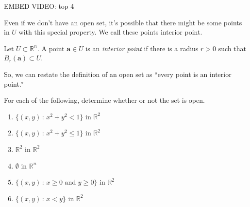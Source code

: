 \documentclass{ximera}
\begin{document}
\begin{minipage}{.5\textwidth}
\end{minipage}
\begin{minipage}{.5\textwidth}
EMBED VIDEO: top 4
\end{minipage}

Even if we don't have an open set, it's possible that there might be some points in $U$ with this special property. We call these points interior point.

\begin{definition}
Let $U\subset \mathbb{R}^n$. A point $\mathbf{a}\in U$ is an \emph{interior point} if there is a radius $r>0$ such that $B_r(\mathbf{a})\subset U$.
\end{definition}

So, we can restate the definition of an open set as ``every point is an interior point.''

\begin{example}
\begin{foldable}
For each of the following, determine whether or not the set is open.

\begin{enumerate}
\item $\{(x,y)\,:\,x^2+y^2<1\}$ in $\mathbb{R}^2$
\begin{multipleChoice}
\end{multipleChoice}			%
\item $\{(x,y)\,:\,x^2+y^2\leq 1\}$ in $\mathbb{R}^2$
\begin{multipleChoice}
\end{multipleChoice}			%
\item $\mathbb{R}^2$ in $\mathbb{R}^2$
\begin{multipleChoice}
\end{multipleChoice}			%
\item $\emptyset$ in $\mathbb{R}^n$
\begin{multipleChoice}
\end{multipleChoice}			%
\item $\{(x,y)\,:\,x\geq 0\textrm{ and }y\geq 0\}$ in $\mathbb{R}^2$
\begin{multipleChoice}
\end{multipleChoice}			%
\item $\{(x,y)\,:\,x<y\}$ in $\mathbb{R}^2$
\begin{multipleChoice}
\end{multipleChoice}			%
\end{enumerate}
\end{foldable}
\end{example}
\end{document}
